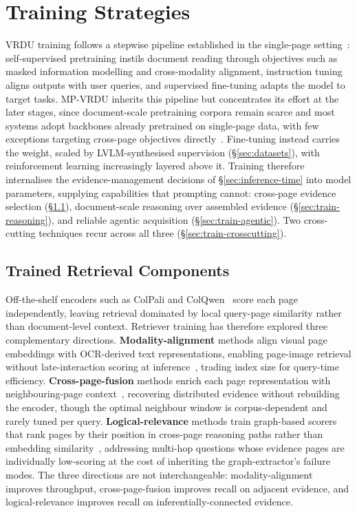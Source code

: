 \documentclass[11pt]{article}
\begin{document}
\section{Training Strategies}
\label{sec:training}
VRDU training follows a stepwise pipeline established in the single-page setting~\cite{ding2026survey}: self-supervised pretraining instils document reading through objectives such as masked information modelling and cross-modality alignment, instruction tuning aligns outputs with user queries, and supervised fine-tuning adapts the model to target tasks. MP-VRDU inherits this pipeline but concentrates its effort at the later stages, since document-scale pretraining corpora remain scarce and most systems adopt backbones already pretrained on single-page data, with few exceptions targeting cross-page objectives directly~\cite{hu2025mplug2, duan2025docopilot}. Fine-tuning instead carries the weight, scaled by LVLM-synthesised supervision (\S\ref{sec:datasets}), with reinforcement learning increasingly layered above it. Training therefore internalises the evidence-management decisions of \S\ref{sec:inference-time} into model parameters, supplying capabilities that prompting cannot: cross-page evidence selection (\S\ref{sec:train-retrieval}), document-scale reasoning over assembled evidence (\S\ref{sec:train-reasoning}), and reliable agentic acquisition (\S\ref{sec:train-agentic}). Two cross-cutting techniques recur across all three (\S\ref{sec:train-crosscutting}).

\subsection{Trained Retrieval Components}
\label{sec:train-retrieval}
Off-the-shelf encoders such as ColPali and ColQwen~\cite{faysse2024colpali} score each page independently, leaving retrieval dominated by local query-page similarity rather than document-level context. Retriever training has therefore explored three complementary directions. \textbf{Modality-alignment} methods align visual page embeddings with OCR-derived text representations, enabling page-image retrieval without late-interaction scoring at inference~\cite{tanaka2025vdocrag}, trading index size for query-time efficiency. \textbf{Cross-page-fusion} methods enrich each page representation with neighbouring-page context~\cite{qian2026accurate}, recovering distributed evidence without rebuilding the encoder, though the optimal neighbour window is corpus-dependent and rarely tuned per query. \textbf{Logical-relevance} methods train graph-based scorers that rank pages by their position in cross-page reasoning paths rather than embedding similarity~\cite{wu2025molorag}, addressing multi-hop questions whose evidence pages are individually low-scoring at the cost of inheriting the graph-extractor's failure modes. The three directions are not interchangeable: modality-alignment improves throughput, cross-page-fusion improves recall on adjacent evidence, and logical-relevance improves recall on inferentially-connected evidence.
\end{document}
